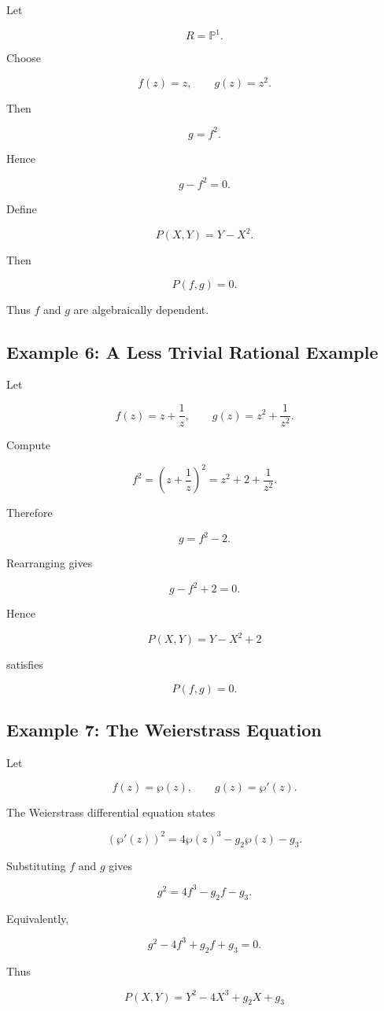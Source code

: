 \documentclass[12pt,a4paper]{article}
\theoremstyle{notespace}
\begin{document}
Let

\[
R=\mathbb P^1.
\]

Choose

\[
f(z)=z,
\qquad
g(z)=z^2.
\]

Then

\[
g=f^2.
\]

Hence

\[
g-f^2=0.
\]

Define

\[
P(X,Y)=Y-X^2.
\]

Then

\[
P(f,g)=0.
\]

Thus \(f\) and \(g\) are algebraically dependent.

\subsection{Example 6: A Less Trivial Rational Example}

Let

\[
f(z)=z+\frac1z,
\qquad
g(z)=z^2+\frac1{z^2}.
\]

Compute

\[
f^2
=
\left(z+\frac1z\right)^2
=
z^2+2+\frac1{z^2}.
\]

Therefore

\[
g
=
f^2-2.
\]

Rearranging gives

\[
g-f^2+2=0.
\]

Hence

\[
P(X,Y)=Y-X^2+2
\]

satisfies

\[
P(f,g)=0.
\]

\subsection{Example 7: The Weierstrass Equation}

Let

\[
f(z)=\wp(z),
\qquad
g(z)=\wp'(z).
\]

The Weierstrass differential equation states

\[
(\wp'(z))^2
=
4\wp(z)^3-g_2\wp(z)-g_3.
\]

Substituting \(f\) and \(g\) gives

\[
g^2
=
4f^3-g_2f-g_3.
\]

Equivalently,

\[
g^2-4f^3+g_2f+g_3=0.
\]

Thus

\[
P(X,Y)
=
Y^2-4X^3+g_2X+g_3
\]
\end{document}
